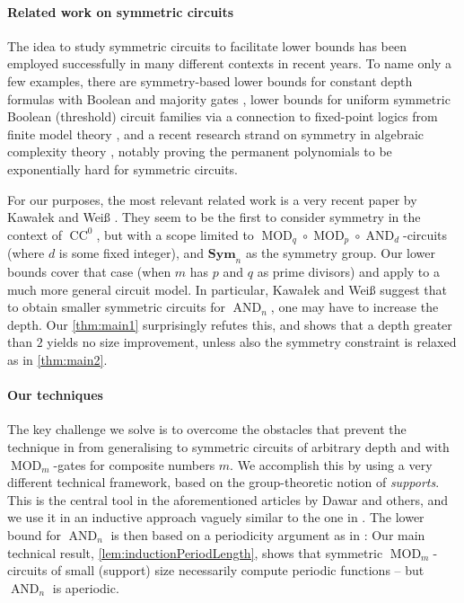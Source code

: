 \documentclass[11pt]{article}
\DeclareMathOperator{\MOD}{MOD}
\DeclareMathOperator{\AND}{AND}
\newcommand{\Sym}{\mathbf{Sym}}
\theoremstyle{definition}
\theoremstyle{plain}
\theoremstyle{remark}
\theoremstyle{remark}
\DeclareMathOperator{\CC}{CC}
\begin{document}
\paragraph*{Related work on symmetric circuits}
The idea to study symmetric circuits to facilitate lower bounds has been employed successfully in many different contexts in recent years.
To name only a few examples, there are symmetry-based lower bounds for constant depth formulas with Boolean and majority gates \cite{HeR23}, lower bounds for uniform symmetric Boolean (threshold) circuit families via a connection to fixed-point logics from finite model theory \cite{anderson_symmetric_2017}, and a recent research strand on symmetry in algebraic complexity theory \cite{DawarW20, dawar2021lower, SymHomPolynomials, STOCpaper}, notably proving the permanent polynomials to be exponentially hard for symmetric circuits.

For our purposes, the most relevant related work is a very recent paper by Kawa\l ek and Weiß \cite{kawalekweiss25}. They seem to be the first to consider symmetry in the context of $\CC^0$, but with a scope limited to $\MOD_q \circ \MOD_p \circ \AND_d$-circuits (where $d$ is some fixed integer), and $\Sym_n$ as the symmetry group. 
Our lower bounds cover that case (when $m$ has $p$ and $q$ as prime divisors) and apply to a much more general circuit model. In particular, Kawa\l ek and Weiß suggest that to obtain smaller symmetric circuits for $\AND_n$, one may have to increase the depth. Our \cref{thm:main1} surprisingly refutes this, and shows that a depth greater than $2$ yields no size improvement, unless also the symmetry constraint is relaxed as in \cref{thm:main2}. 
 
 \paragraph*{Our techniques}
The key challenge we solve is to overcome the obstacles that prevent the technique in
 \cite{kawalekweiss25} from generalising to symmetric circuits of arbitrary depth and with $\MOD_m$-gates for composite numbers $m$. We accomplish this by using a very different technical framework, based on the group-theoretic notion of \emph{supports}. This is the central tool in the aforementioned articles by Dawar and others, and we use it in an inductive approach vaguely similar to the one in \cite{SymHomPolynomials}.
 The lower bound for $\AND_n$ is then based on a periodicity argument as in \cite{kawalekweiss25}:
 Our main technical result, \cref{lem:inductionPeriodLength}, shows that symmetric $\MOD_m$-circuits of small (support) size necessarily compute periodic functions -- but $\AND_n$ is aperiodic.
 
\end{document}
